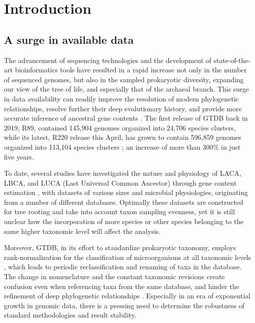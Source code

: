 \section{Introduction}
\normalsize

\subsection*{A surge in available data}

The advancement of sequencing technologies and the development of state-of-the-art bioinformatics tools have resulted in a rapid increase not only in the number of sequenced genomes, but also in the sampled prokaryotic diversity, expanding our view of the tree of life, and especially that of the archaeal branch. This surge in data availability can readily improve the resolution of modern phylogenetic relationships, resolve further their deep evolutionary history, and provide more accurate inference of ancestral gene contents \cite{tahon2021}. The first release of GTDB back in 2019, R89, contained 145,904 genomes organized into 24,706 species clusters, while its latest, R220 release this April, has grown to contain 596,859 genomes organized into 113,104 species clusters \cite{parks2018, parks2020, parks2022, rinke2021}; an increase of more than 300\% in just five years.

To date, several studies have investigated the nature and physiology of LACA, LBCA, and LUCA (Last Universal Common Ancestor) through gene content estimation \cite{williams2017, xavier2021, moody2024, coleman2021}, with datasets of various sizes and microbial physiologies, originating from a number of different databases. Optimally these datasets are constructed for tree rooting and take into account taxon sampling evenness, yet it is still unclear how the incorporation of more species or other species belonging to the same higher taxonomic level will affect the analysis.
 
Moreover, GTDB, in its effort to standardize prokaryotic taxonomy, employs rank-normalization for the classification of microorganisms at all taxonomic levels \cite{parks2018}, which leads to periodic reclassification and renaming of taxa in the database. The change in nomenclature and the constant taxonomic revisions create confusion even when referencing taxa from the same database, and hinder the refinement of deep phylogenetic relationships \cite{tahon2021}. Especially in an era of exponential growth in genomic data, there is a pressing need to determine the robustness of standard methodologies and result stability.


